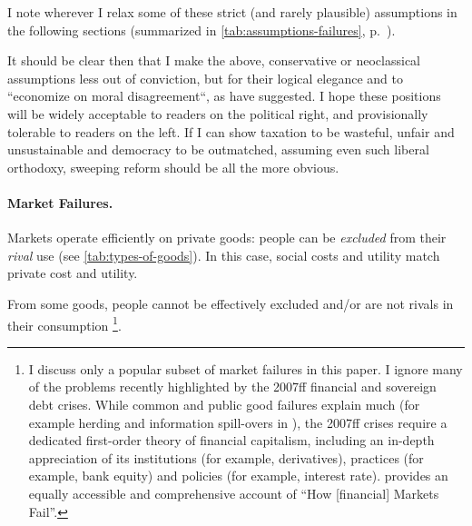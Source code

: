 I note wherever I relax some of these strict (and rarely plausible) assumptions in the following sections (summarized in \autoref{tab:assumptions-failures}, p.~\pageref{tab:assumptions-failures}).

It should be clear then that I make the above, conservative or neoclassical assumptions less out of conviction, but for their logical elegance and to ``economize on moral disagreement``, as \cite[K226]{GutmannThompson-2004-aa} have suggested.
I hope these positions will be widely acceptable to readers on the political right, and provisionally tolerable to readers on the left. 
If I can show taxation to be wasteful, unfair and unsustainable and democracy to be outmatched, assuming even such liberal orthodoxy, sweeping reform should be all the more obvious.

	

\paragraph{Market Failures.}  \label{sec:market-failures} 
Markets operate efficiently on private goods: people can be \emph{excluded} from their \emph{rival} use (see \autoref{tab:types-of-goods}). 
In this case, social costs and utility match private cost and utility. 

From some goods, people cannot be effectively excluded and/or are not rivals in their consumption
\footnote{
	I discuss only a popular subset of market failures in this paper. 
	I ignore many of the problems recently highlighted by the 2007ff financial and sovereign debt crises. 
	While common and public good failures explain much (for example herding and information spill-overs in \citealt{Banerjee-1992-aa}), the 2007ff crises require a dedicated first-order theory of financial capitalism, including an in-depth appreciation of its institutions (for example, derivatives), practices (for example, bank equity) and policies (for example, interest rate). 
	\cite{Cassidy2010} provides an equally accessible and comprehensive account of ``How [financial] Markets Fail''. 
	}.
	
